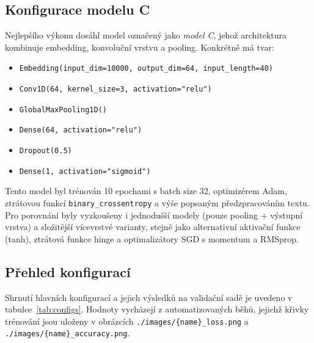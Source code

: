 \documentclass[a4paper,oneside,11pt,usenames,dvipsnames]{article}
\begin{document}
\subsection{Konfigurace modelu C\label{subsec:konfigurace-modelu-c}}
Nejlepšího výkonu dosáhl model označený jako \emph{model C}, jehož architektura kombinuje embedding, konvoluční vrstvu a pooling. Konkrétně má tvar:
\begin{itemize}
    \item \texttt{Embedding(input\_dim=10000, output\_dim=64, input\_length=40)}
    \item \texttt{Conv1D(64, kernel\_size=3, activation="relu")}
    \item \texttt{GlobalMaxPooling1D()}
    \item \texttt{Dense(64, activation="relu")}
    \item \texttt{Dropout(0.5)}
    \item \texttt{Dense(1, activation="sigmoid")}
\end{itemize}
Tento model byl trénován 10 epochami s batch size 32, optimizérem Adam, ztrátovou funkcí \texttt{binary\_crossentropy} a výše popsaným předzpracováním textu. Pro porovnání byly vyzkoušeny i jednodušší modely (pouze pooling + výstupní vrstva) a složitější vícevrstvé varianty, stejně jako alternativní aktivační funkce (tanh), ztrátová funkce hinge a optimalizátory SGD s momentum a RMSprop.

\subsection{Přehled konfigurací\label{subsec:prehled-konfiguraci}}
Shrnutí hlavních konfigurací a jejich výsledků na validační sadě je uvedeno v tabulce~\ref{tab:configs}. Hodnoty vycházejí z automatizovaných běhů, jejichž křivky trénování jsou uloženy v obrázcích \texttt{./images/\{name\}\_loss.png} a \texttt{./images/\{name\}\_accuracy.png}.
\end{document}
